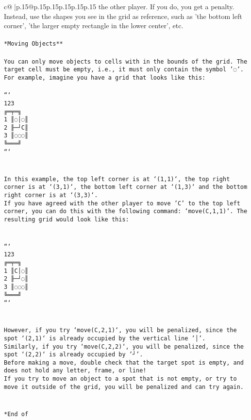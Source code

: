 \documentclass{article}
\begin{document}
{\begin{supertabular}{c@{$\;$}|p{.15\linewidth}@{}p{.15\linewidth}p{.15\linewidth}p{.15\linewidth}p{.15\linewidth}p{.15\linewidth}}
{{{the other player. If you do, you get a penalty. Instead, use the shapes you see in the grid as reference, such as 'the bottom left corner', 'the larger empty rectangle in the lower center', etc.\\ \tt \\ \tt **Moving Objects**\\ \tt \\ \tt * You can only move objects to cells with in the bounds of the grid. The target cell must be empty, i.e., it must only contain the symbol '◌'.\\ \tt * For example, imagine you have a grid that looks like this: \\ \tt \\ \tt ```\\ \tt     123\\ \tt    ╔═╤═╗\\ \tt  1 ║◌│◌║\\ \tt  2 ╟─┘C║\\ \tt  3 ║◌◌◌║\\ \tt    ╚═══╝\\ \tt ```\\ \tt \\ \tt \\ \tt * In this example, the top left corner is at `(1,1)`, the top right corner is at `(3,1)`, the bottom left corner at `(1,3)` and the bottom right corner is at `(3,3)`.\\ \tt * If you have agreed with the other player to move 'C' to the top left corner, you can do this with the following command: `move(C,1,1)`. The resulting grid would look like this: \\ \tt \\ \tt \\ \tt ```\\ \tt     123\\ \tt    ╔═╤═╗\\ \tt  1 ║C│◌║\\ \tt  2 ╟─┘◌║\\ \tt  3 ║◌◌◌║\\ \tt    ╚═══╝\\ \tt ```\\ \tt \\ \tt \\ \tt * However, if you try `move(C,2,1)`, you will be penalized, since the spot `(2,1)` is already occupied by the vertical line '│'.\\ \tt * Similarly, if you try `move(C,2,2)`, you will be penalized, since the spot `(2,2)` is already occupied by '┘'.\\ \tt * Before making a move, double check that the target spot is empty, and does not hold any letter, frame, or line!\\ \tt * If you try to move an object to a spot that is not empty, or try to move it outside of the grid, you will be penalized and can try again.\\ \tt \\ \tt \\ \tt **End of }}}
\end{supertabular}}
\end{document}
